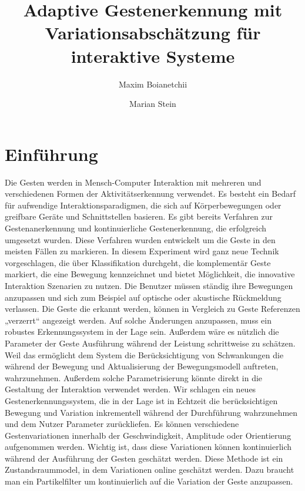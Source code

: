 \documentclass{llncs}
\begin{document}
\pagestyle{headings}

\mainmatter

\title{Adaptive Gestenerkennung mit Variationsabschätzung für interaktive Systeme}


\author{Maxim Boianetchii \and Marian Stein}



\maketitle
\section{Einführung}
Die Gesten werden in Mensch-Computer Interaktion mit mehreren und verschiedenen Formen der Aktivitätserkennung verwendet. Es besteht ein Bedarf  für aufwendige Interaktionsparadigmen, die sich auf Körperbewegungen oder greifbare Geräte und Schnittstellen basieren. Es gibt bereits Verfahren zur Gestenanerkennung und kontinuierliche Gestenerkennung, die erfolgreich umgesetzt wurden. Diese Verfahren wurden entwickelt um die Geste in den meisten Fällen zu markieren. In diesem Experiment wird ganz neue Technik vorgeschlagen, die über Klassifikation durchgeht, die komplementär Geste markiert, die eine Bewegung kennzeichnet und bietet Möglichkeit, die innovative Interaktion Szenarien zu nutzen.
Die Benutzer müssen  ständig ihre Bewegungen anzupassen und sich zum Beispiel auf optische oder akustische Rückmeldung verlassen. Die Geste die erkannt werden, können in Vergleich zu Geste Referenzen „verzerrt“ angezeigt werden. Auf solche Änderungen anzupassen, muss ein robustes Erkennungssystem in der Lage sein. Außerdem wäre es nützlich die Parameter der Geste Ausführung während der Leistung schrittweise zu schätzen. Weil das ermöglicht dem System die Berücksichtigung von Schwankungen die während der Bewegung und Aktualisierung der Bewegungsmodell auftreten,  wahrzunehmen. Außerdem solche Parametrisierung  könnte direkt in die Gestaltung der Interaktion verwendet werden.
Wir schlagen ein neues Gestenerkennungssystem, die in der Lage ist in Echtzeit die berücksichtigen Bewegung und Variation inkrementell während der Durchführung wahrzunehmen und dem Nutzer Parameter zurückliefen. Es können verschiedene Gestenvariationen innerhalb der Geschwindigkeit, Amplitude oder Orientierung aufgenommen werden. Wichtig ist, dass diese Variationen können kontinuierlich während der Ausführung der Gesten geschätzt werden. Diese Methode ist ein Zustandsraummodel, in dem Variationen online geschätzt werden. Dazu braucht man ein Partikelfilter um kontinuierlich auf die Variation der Geste anzupassen.
\end{document}
